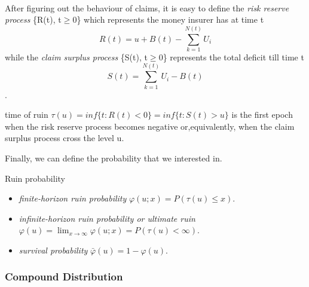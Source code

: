 \documentclass[project2.tex]{subfiles}
\begin{document}
\paragraph{}
After figuring out the behaviour of claims, it is easy to define the {\it risk reserve process} \{R(t), t$\geq 0$\} which represents the money insurer has at time t $$R(t)=u+ B(t)-\sum^{N(t)}_{k=1}U_i$$ while the {\it claim surplus process}  \{S(t), t$\geq 0$\}  represents the total deficit till time t $$S(t)=\sum^{N(t)}_{k=1}U_i-B(t)$$.  
\begin{observation}
time of ruin $\tau (u)=inf\{t: R(t)<0\}=inf\{t:S(t)>u\}$ is the first epoch when the risk reserve process becomes negative or,equivalently, when the claim surplus process cross the level u.
\end{observation}
Finally, we can define the probability that we interested in.
\begin{definition}
Ruin probability
\end{definition}
\begin{itemize}
\item {\it finite-horizon ruin probability} $\varphi (u;x)=P(\tau (u)\leq x)$.
\item {\it infinite-horizon ruin probability or ultimate ruin} $\varphi (u)=\lim_{x \to \infty}\varphi (u;x)=P(\tau (u)< \infty)$.
\item {\it survival probability} $\bar{\varphi}(u)=1-\varphi(u)$.
\end{itemize}
\subsubsection{Compound Distribution}
\end{document}
